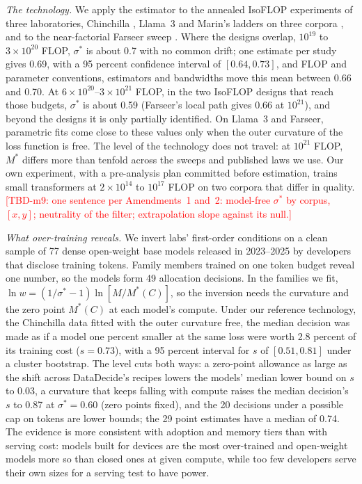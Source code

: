 \textit{The technology.} We apply the estimator to the annealed IsoFLOP experiments of three laboratories, Chinchilla
\citep{hoffmann2022training}, Llama~3 \citep{grattafiori2024llama} and Marin's ladders on three corpora
\citep{marin2026ladders}, and to the near-factorial Farseer sweep \citep{li2025predictableb}. Where the designs
overlap, $10^{19}$ to $3\times10^{20}$ FLOP, $\sigma^*$ is about 0.7 with no common drift; one estimate per study
gives 0.69, with a 95 percent confidence interval of $[0.64, 0.73]$, and FLOP and parameter conventions, estimators
and bandwidths move this mean between 0.66 and 0.70. At $6\times10^{20}$--$3\times10^{21}$ FLOP, in the two IsoFLOP
designs that reach those budgets, $\sigma^*$ is about 0.59 (Farseer's local path gives 0.66 at $10^{21}$), and beyond
the designs it is only partially identified. On Llama~3 and Farseer, parametric fits come close to these values only
when the outer curvature of the loss function is free. The level of the technology does not travel: at $10^{21}$ FLOP,
$M^*$ differs more than tenfold across the sweeps and published laws we use. Our own experiment, with a pre-analysis
plan committed before estimation, trains small transformers at $2\times10^{14}$ to $10^{17}$ FLOP on two corpora that
differ in quality. \textcolor{red}{[TBD-m9: one sentence per Amendments~1 and~2: model-free $\sigma^*$ by corpus, $[x,
y]$; neutrality of the filter; extrapolation slope against its null.]}

\textit{What over-training reveals.} We invert labs' first-order conditions on a clean sample of 77 dense open-weight
base models released in 2023--2025 by developers that disclose training tokens. Family members trained on one token
budget reveal one number, so the models form 49 allocation decisions. In the families we fit, $\ln
w=(1/\sigma^*-1)\ln[M/M^*(C)]$, so the inversion needs the curvature and the zero point $M^*(C)$ at each model's
compute. Under our reference technology, the Chinchilla data fitted with the outer curvature free, the median decision
was made as if a model one percent smaller at the same loss were worth 2.8 percent of its training cost ($s=0.73$),
with a 95 percent interval for $s$ of $[0.51, 0.81]$ under a cluster bootstrap. The level cuts both ways: a zero-point
allowance as large as the shift across DataDecide's recipes lowers the models' median lower bound on $s$ to 0.03, a
curvature that keeps falling with compute raises the median decision's $s$ to 0.87 at $\sigma^*=0.60$ (zero points
fixed), and the 20 decisions under a possible cap on tokens are lower bounds; the 29 point estimates have a median of
0.74. The evidence is more consistent with adoption and memory tiers than with serving cost: models built for devices
are the most over-trained and open-weight models more so than closed ones at given compute, while too few developers
serve their own sizes for a serving test to have power.

